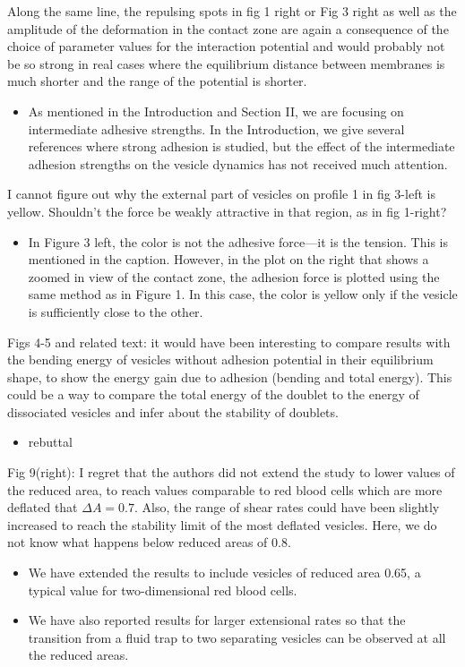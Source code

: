 \documentclass[11pt]{article}
\newcommand{\comment}[1]{{\color{blue} #1}}
\begin{document}
\noindent
\comment{Along the same line, the repulsing spots in fig 1 right or Fig 3
right as well as the amplitude of the deformation in the contact zone
are again a consequence of the choice of parameter values for the
interaction potential and would probably not be so strong in real
cases where the equilibrium distance between membranes is much shorter
and the range of the potential is shorter.}
\begin{itemize}
  \item As mentioned in the Introduction and Section II, we are focusing
    on intermediate adhesive strengths.  In the Introduction, we give
    several references where strong adhesion is studied, but the effect
    of the intermediate adhesion strengths on the vesicle dynamics has
    not received much attention.
\end{itemize}

\noindent
\comment{I cannot figure out why the external part of vesicles on profile 1
in fig 3-left is yellow. Shouldn't the force be weakly attractive in
that region, as in fig 1-right?}
\begin{itemize}
  \item In Figure 3 left, the color is not the adhesive force---it is the
    tension.  This is mentioned in the caption.  However, in the plot on
    the right that shows a zoomed in view of the contact zone, the
    adhesion force is plotted using the same method as in Figure 1.  In
    this case, the color is yellow only if the vesicle is sufficiently
    close to the other.
\end{itemize}

\noindent
\comment{Figs 4-5 and related text: it would have been interesting to
compare results with the bending energy of vesicles without adhesion
potential in their equilibrium shape, to show the energy gain due to
adhesion (bending and total energy). This could be a way to compare
the total energy of the doublet to the energy of dissociated vesicles
and infer about the stability of doublets.}
\begin{itemize}
  \item rebuttal
\end{itemize}

\noindent
\comment{Fig 9(right): I regret that the authors did not extend the study
to lower values of the reduced area, to reach values comparable to red
blood cells which are more deflated that $\Delta A=0.7$. Also, the range
of shear rates could have been slightly increased to reach the
stability limit of the most deflated vesicles. Here, we do not know
what happens below reduced areas of 0.8.}
\begin{itemize}
  \item We have extended the results to include vesicles of reduced area
    0.65, a typical value for two-dimensional red blood cells.
  \item We have also reported results for larger extensional rates so
    that the transition from a fluid trap to two separating vesicles can
    be observed at all the reduced areas.
\end{itemize}
\end{document}

